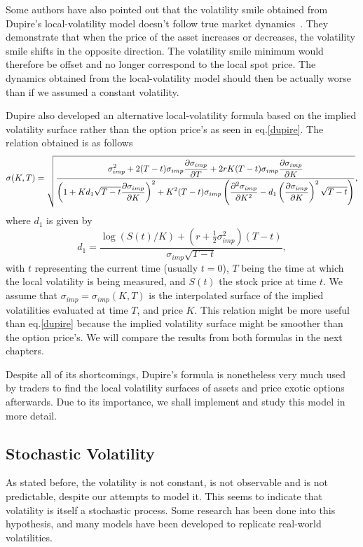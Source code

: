 Some authors have also pointed out that the volatility smile obtained from Dupire's local-volatility model doesn't follow true market dynamics~\cite{Hagan}. They demonstrate that when the price of the asset increases or decreases, the volatility smile shifts in the opposite direction. The  volatility smile minimum would therefore be offset and no longer correspond to the local spot price. The dynamics obtained from the local-volatility model should then be actually worse than if we assumed a constant volatility.


Dupire also developed an alternative local-volatility formula based on the implied volatility surface rather than the option price's as seen in eq.\ref{dupire}.
The relation obtained is as follows
\begin{equation}\label{dupire2}
\sigma(K,T)=\sqrt{\frac{\displaystyle\sigma_{imp}^2+2(T-t)\sigma_{imp}\pdv{\sigma_{imp}}{T}+2rK(T-t)\sigma_{imp}\pdv{\sigma_{imp}}{K}}{\displaystyle\left(1+Kd_1\sqrt{T-t}\pdv{\sigma_{imp}}{K}\right)^2+K^2(T-t)\sigma_{imp}\left(\pdv{^2\sigma_{imp}}{K^2}-d_1\left(\pdv{\sigma_{imp}}{K}\right)^2\sqrt{T-t}\right)}},
\end{equation}
\noindent where $d_1$ is given by
\begin{equation}
d_1=\frac{\log(S(t)/K)+\left(r+\frac{1}{2}\sigma_{imp}^2\right)(T-t)}{\sigma_{imp}\sqrt{T-t}},
\end{equation}
\noindent with $t$ representing the current time (usually $t=0$), $T$ being the time at which the local volatility is being measured, and $S(t)$ the stock price at time $t$. We assume that $\sigma_{imp}=\sigma_{imp}(K,T)$ is the interpolated surface of the implied volatilities evaluated at time $T$, and price $K$.
This relation might be more useful than eq.\eqref{dupire} because the implied volatility surface might be smoother than the option price's. We will compare the results from both formulas in the next chapters.




Despite all of its shortcomings, Dupire's formula is nonetheless very much used by traders to find the local volatility surfaces of assets and price exotic options afterwards. Due to its importance, we shall implement and study this model in more detail.


\subsection{Stochastic Volatility}
\label{subsection:stochastic volatility}
As stated before, the volatility is not constant, is not observable and is not predictable, despite our attempts to model it. This seems to indicate that volatility is itself a stochastic process. Some research has been done into this hypothesis, and many models have been developed to replicate real-world volatilities.

